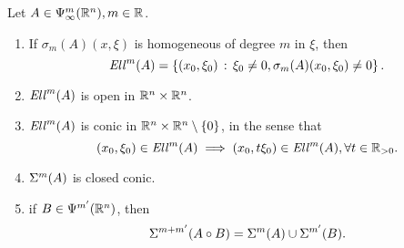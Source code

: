 \documentclass[12pt]{article}
\begin{document}
\begin{flemma}
    Let $A \in \Psi^m_\infty({\mathbb R}^n), m \in {\ensuremath {\mathbb R}}$. 
    \begin{enumerate}
        \item If $\sigma_m(A)(x, \xi)$ is homogeneous of degree $m$ in $\xi$, then 
        \[
        \mathit{Ell}^m(A) = \left\{(x_0, \xi_0) \, : \,  \xi_0 \neq 0, \sigma_m(A)(x_0, \xi_0) \neq 0\right\}. 
        \]
        \item $\mathit{Ell}^m(A) $ is open in ${\mathbb R}^n \times {\ensuremath {\mathbb R}}^n$. 
        \item $\mathit{Ell}^m(A)$ is conic in ${\mathbb R}^n \times {\ensuremath {\mathbb R}}^n \setminus \left\{0\right\}$, in the sense that 
        \[(x_0, \xi_0) \in \mathit{Ell}^m(A) \implies (x_0, t \xi_0) \in \mathit{Ell}^m(A), \forall t \in {\ensuremath {\mathbb R}}_{>0}.\] 
        \item $\Sigma^m(A)$ is closed conic. 
        \item if $B \in \Psi^{m'}({\mathbb R}^n)$, then 
        \[\Sigma^{m + m'}(A \circ B) = \Sigma^m(A) \cup \Sigma^{m'}(B).\]
    \end{enumerate}
\end{flemma}
\end{document}
